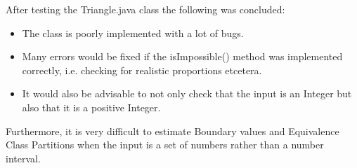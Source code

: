 After testing the Triangle.java class the following was concluded:
\begin{itemize}
	\item The class is poorly implemented with a lot of bugs.
	\item Many errors would be fixed if the isImpossible() method was implemented correctly, i.e. checking for realistic proportions etcetera.
	\item It would also be advisable to not only check that the input is an Integer but also that it is a positive Integer.
\end{itemize}

\noindent Furthermore, it is very difficult to estimate Boundary values and Equivalence Class Partitions when the input is a set of numbers rather than a number interval. 

